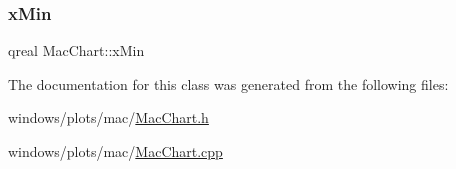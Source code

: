 \mbox{\label{class_mac_chart_a3d658d8028a6963859bf204ccb738826}} 
\subsubsection{\texorpdfstring{x\+Min}{xMin}}
{\footnotesize\ttfamily qreal Mac\+Chart\+::x\+Min}



The documentation for this class was generated from the following files\+:\begin{DoxyCompactItemize}
\item 
windows/plots/mac/\hyperlink{_mac_chart_8h}{Mac\+Chart.\+h}\item 
windows/plots/mac/\hyperlink{_mac_chart_8cpp}{Mac\+Chart.\+cpp}\end{DoxyCompactItemize}

